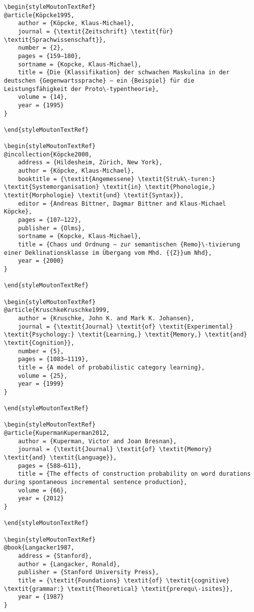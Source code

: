 \begin{styleMoutonHeadingi}
\begin{verbatim}
\begin{styleMoutonTextRef}
@article{Köpcke1995,
	author = {Köpcke, Klaus-Michael},
	journal = {\textit{Zeitschrift} \textit{für} \textit{Sprachwissenschaft}},
	number = {2},
	pages = {159–180},
	sortname = {Kopcke, Klaus-Michael},
	title = {Die {Klassifikation} der schwachen Maskulina in der deutschen {Gegenwartssprache} – ein {Beispiel} für die Leistungsfähigkeit der Proto\-typentheorie},
	volume = {14},
	year = {1995}
}

\end{styleMoutonTextRef}

\begin{styleMoutonTextRef}
@incollection{Köpcke2000,
	address = {Hildesheim, Zürich, New York},
	author = {Köpcke, Klaus-Michael},
	booktitle = {\textit{Angemessene} \textit{Struk\-turen:} \textit{Systemorganisation} \textit{in} \textit{Phonologie,} \textit{Morphologie} \textit{und} \textit{Syntax}},
	editor = {Andreas Bittner, Dagmar Bittner and Klaus-Michael Köpcke},
	pages = {107–122},
	publisher = {Olms},
	sortname = {Kopcke, Klaus-Michael},
	title = {Chaos und Ordnung – zur semantischen {Remo}\-tivierung einer Deklinationsklasse im Übergang vom Mhd. {{Z}}um Nhd},
	year = {2000}
}

\end{styleMoutonTextRef}

\begin{styleMoutonTextRef}
@article{KruschkeKruschke1999,
	author = {Kruschke, John K. and Mark K. Johansen},
	journal = {\textit{Journal} \textit{of} \textit{Experimental} \textit{Psychology:} \textit{Learning,} \textit{Memory,} \textit{and} \textit{Cognition}},
	number = {5},
	pages = {1083–1119},
	title = {A model of probabilistic category learning},
	volume = {25},
	year = {1999}
}

\end{styleMoutonTextRef}

\begin{styleMoutonTextRef}
@article{KupermanKuperman2012,
	author = {Kuperman, Victor and Joan Bresnan},
	journal = {\textit{Journal} \textit{of} \textit{Memory} \textit{and} \textit{Language}},
	pages = {588–611},
	title = {The effects of construction probability on word durations during spontaneous incremental sentence production},
	volume = {66},
	year = {2012}
}

\end{styleMoutonTextRef}

\begin{styleMoutonTextRef}
@book{Langacker1987,
	address = {Stanford},
	author = {Langacker, Ronald},
	publisher = {Stanford University Press},
	title = {\textit{Foundations} \textit{of} \textit{cognitive} \textit{grammar:} \textit{Theoretical} \textit{prerequ\-isites}},
	year = {1987}
}


\end{verbatim}
\end{styleMoutonHeadingi}
